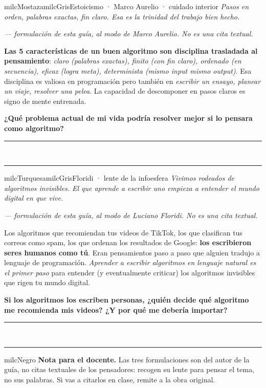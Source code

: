 \documentclass[11pt,letterpaper]{article}
\newcommand{\linead}[1]{\noindent\color{milcLinea}\rule{#1}{0.5pt}\color{milcNegro}}
\begin{document}
\begin{softbox}{milcMostaza}{milcGris}{Estoicismo · Marco Aurelio · cuidado interior}
\textit{Pasos en orden, palabras exactas, fin claro. Esa es la trinidad del trabajo bien hecho.}

{\footnotesize\itshape\color{milcNegro!70}--- formulación de esta guía, al modo de Marco Aurelio. No es una cita textual.}

\textbf{Las 5 características de un buen algoritmo son disciplina trasladada al pensamiento}: \emph{claro (palabras exactas), finito (con fin claro), ordenado (en secuencia), eficaz (logra meta), determinista (mismo input mismo output)}. Esa disciplina es valiosa en programación pero también en \emph{escribir un ensayo, planear un viaje, resolver una pelea}. La capacidad de descomponer en pasos claros es signo de mente entrenada.

\textbf{¿Qué problema actual de mi vida podría resolver mejor si lo pensara como algoritmo?}
\end{softbox}
\linead{\linewidth}\\[1mm]
\linead{\linewidth}

\begin{softbox}{milcTurquesa}{milcGris}{Floridi · lente de la infoesfera}
\textit{Vivimos rodeados de algoritmos invisibles. El que aprende a escribir uno empieza a entender el mundo digital en que vive.}

{\footnotesize\itshape\color{milcNegro!70}--- formulación de esta guía, al modo de Luciano Floridi. No es una cita textual.}

Los algoritmos que recomiendan tus videos de TikTok, los que clasifican tus correos como spam, los que ordenan los resultados de Google: \textbf{los escribieron seres humanos como tú}. Eran pensamientos paso a paso que alguien tradujo a lenguaje de programación. \emph{Aprender a escribir algoritmos en lenguaje natural es el primer paso} para entender (y eventualmente criticar) los algoritmos invisibles que rigen tu mundo digital.

\textbf{Si los algoritmos los escriben personas, ¿quién decide qué algoritmo me recomienda mis videos? ¿Y por qué me debería importar?}
\end{softbox}
\linead{\linewidth}\\[1mm]
\linead{\linewidth}

\begin{infoband}{milcNegro}
\textbf{Nota para el docente.} Las tres formulaciones son del autor de la guía, no citas textuales de los pensadores: recogen su lente para pensar el tema, no sus palabras. Si vas a citarlos en clase, remite a la obra original.
\end{infoband}
\end{document}
